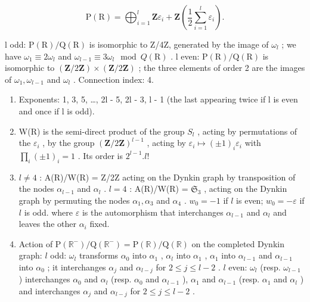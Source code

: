 \[
\mathrm{P} (\mathrm{R}) = \bigoplus_ {i = 1} ^ {l} \mathbf {Z} \varepsilon_ {i} + \mathbf {Z} \left(\frac {1}{2} \sum_ {i = 1} ^ {l} \varepsilon_ {i}\right).
\]

l odd: \(\mathrm{P}(\mathrm{R})/\mathrm{Q}(\mathrm{R})\) is isomorphic to Z/4Z, generated by the image of \(\omega_{l}\) ; we have \(\omega_{1} \equiv 2\omega_{l}\) and \(\omega_{l-1} \equiv 3\omega_{l} \mod Q(\mathrm{R})\) . l even: \(\mathrm{P}(\mathrm{R})/\mathrm{Q}(\mathrm{R})\) is isomorphic to \((\mathbf{Z}/2\mathbf{Z}) \times (\mathbf{Z}/2\mathbf{Z})\) ; the three elements of order 2 are the images of \(\omega_{1}, \omega_{l-1}\) and \(\omega_{l}\) . Connection index: 4.

\begin{enumerate}
\def\labelenumi{(\Roman{enumi})}
\setcounter{enumi}{8}
\item
  Exponents: 1, 3, 5, \ldots, 2l - 5, 2l - 3, l - 1 (the last appearing twice if l is even and once if l is odd).
\item
  W(R) is the semi-direct product of the group \(S_{l}\) , acting by permutations of the \(\varepsilon_{i}\) , by the group \((\mathbf{Z}/2\mathbf{Z})^{l-1}\) , acting by \(\varepsilon_{i} \mapsto (\pm1)_{i}\varepsilon_{i}\) with \(\prod_{i}(\pm1)_{i} = 1\) . Its order is \(2^{l-1}.l!\)
\item
  \(l \neq 4\) : A(R)/W(R) = Z/2Z acting on the Dynkin graph by transposition of the nodes \(\alpha_{l-1}\) and \(\alpha_l\) . \(l = 4\) : A(R)/W(R) = \(\mathfrak{S}_3\) , acting on the Dynkin graph by permuting the nodes \(\alpha_1, \alpha_3\) and \(\alpha_4\) . \(w_0 = -1\) if \(l\) is even; \(w_0 = -\varepsilon\) if \(l\) is odd. where \(\varepsilon\) is the automorphism that interchanges \(\alpha_{l-1}\) and \(\alpha_l\) and leaves the other \(\alpha_i\) fixed.
\item
  Action of \(\mathrm{P}(\mathbb{R}^{-}) / \mathrm{Q}(\mathbb{R}^{-}) = \mathrm{P}(\mathbb{R}) / \mathrm{Q}(\mathbb{R})\) on the completed Dynkin graph: \(l\) odd: \(\omega_l\) transforms \(\alpha_0\) into \(\alpha_1\) , \(\alpha_l\) into \(\alpha_1\) , \(\alpha_1\) into \(\alpha_{l-1}\) and \(\alpha_{l-1}\) into \(\alpha_0\) ; it interchanges \(\alpha_j\) and \(\alpha_{l-j}\) for \(2 \leqslant j \leqslant l - 2\) . \(l\) even: \(\omega_l\) (resp. \(\omega_{l-1}\) ) interchanges \(\alpha_0\) and \(\alpha_l\) (resp. \(\alpha_0\) and \(\alpha_{l-1}\) ), \(\alpha_1\) and \(\alpha_{l-1}\) (resp. \(\alpha_1\) and \(\alpha_l\) ) and interchanges \(\alpha_j\) and \(\alpha_{l-j}\) for \(2 \leqslant j \leqslant l - 2\) .
\end{enumerate}


